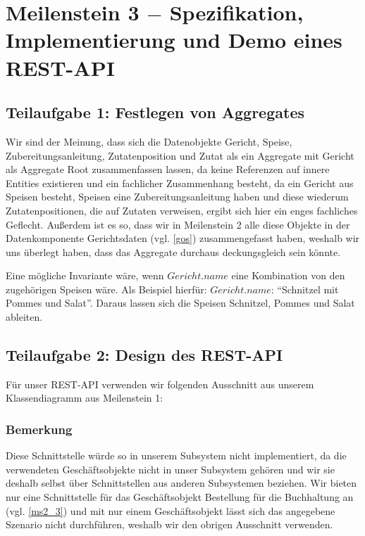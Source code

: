 \section{Meilenstein 3 $-$ Spezifikation, Implementierung
  und Demo eines REST-API}

\subsection{Teilaufgabe 1: Festlegen von Aggregates}



Wir sind der Meinung, dass sich die Datenobjekte Gericht,
Speise, Zubereitungsanleitung, Zutatenposition und Zutat
als ein Aggregate mit Gericht als Aggregate Root
zusammenfassen lassen, da keine Referenzen auf innere
Entities existieren und ein fachlicher Zusammenhang
besteht, da ein Gericht aus Speisen besteht, Speisen eine
Zubereitungsanleitung haben und diese wiederum
Zutatenpositionen, die auf Zutaten verweisen, ergibt sich
hier ein enges fachliches Geflecht. Au{\ss}erdem ist es so,
dass wir in Meilenstein 2 alle diese Objekte in der
Datenkomponente Gerichtsdaten (vgl. \ref{gos})
zusammengefasst haben, weshalb wir uns \"uberlegt haben,
dass das Aggregate durchaus deckungsgleich sein k\"onnte.

Eine m\"ogliche Invariante w\"are, wenn $Gericht.name$ eine
Kombination von den zugeh\"origen Speisen w\"are. Als
Beispiel hierf\"ur: $Gericht.name$: "`Schnitzel mit Pommes
und Salat"'. Daraus lassen sich die Speisen Schnitzel,
Pommes und Salat ableiten.

\subsection{Teilaufgabe 2: Design des REST-API}

F\"ur unser REST-API verwenden wir folgenden Ausschnitt aus
unserem Klassendiagramm aus Meilenstein 1:



\subsubsection*{Bemerkung}

Diese Schnittstelle w\"urde so in unserem Subsystem nicht
implementiert, da die verwendeten Gesch\"aftsobjekte nicht
in unser Subsystem geh\"oren und wir sie deshalb selbst
\"uber Schnittstellen aus anderen Subsystemen beziehen.
Wir bieten nur eine Schnittstelle f\"ur das
Gesch\"aftsobjekt Bestellung f\"ur die Buchhaltung an (vgl.
\ref{ms2_3}) und mit nur einem Gesch\"aftsobjekt l\"asst
sich das angegebene Szenario nicht durchf\"uhren, weshalb
wir den obrigen Ausschnitt verwenden.


